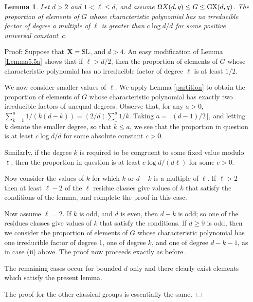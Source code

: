 \documentclass[12pt]{article}
\newtheorem{lemma}[definition]{Lemma}
\newenvironment{proof}{\normalsize {\sc Proof}:}{{\hfill $\Box$ \\}}
\def\SL{{\rm SL}}
\def\GX{{\rm GX}}
\begin{document}
\begin{lemma} 
\label{nofactor}
Let $d > 2$ and $1<\ell\le d$, and 
assume $\Omega X(d,q)\le G\le\GX(d,q)$.  
The proportion of elements of $G$ whose
characteristic polynomial has no irreducible factor of degree a multiple
of $\ell$ is greater than $c\log d/d$ for some positive universal 
constant~$c$.
\end{lemma}
\begin{proof}  
Suppose that $\mathbf{X} = \SL$, and $d>4$.  
An easy modification of Lemma \ref{Lemma5.5a}  shows that 
if $\ell>d/2$, then the proportion of elements of $G$ whose 
characteristic polynomial has no irreducible factor of 
degree $\ell$ is at least $1/2$.  

We now consider smaller values of $\ell$.
We apply Lemma \ref{partition} to obtain 
the proportion of elements of $G$
whose characteristic polynomial has exactly two irreducible factors
of unequal degrees.
Observe that, for any $a>0$,
$\sum_{k=1}^a1/(k(d-k))= (2/d)\sum_1^a1/k$. 
Taking $a=\lfloor(d-1)/2\rfloor$, and letting $k$ denote the smaller degree,
so that $k\le a$,  we see that the proportion in question is
at least $c\log d/d$ for some absolute constant $c>0$.


Similarly, if the degree $k$ is required to be congruent to some
fixed value modulo $\ell$, then the proportion in question is at least
$c\log d/(d\ell)$ for some $c>0$.

Now consider the values of $k$ for which $k$ or $d-k$  
is a multiple of $\ell$.  If $\ell>2$ then at least $\ell-2$ of the
$\ell$  residue classes give values 
of $k$ that satisfy the conditions
of the lemma, and complete the proof in this case.

Now assume $\ell = 2$.
If $k$ is odd, and $d$ is even, then $d-k$ is odd; 
so one of the residues classes give values
of $k$ that satisfy the conditions.
If $d\ge9$ is odd, then we consider the proportion of elements 
of $G$ whose
characteristic polynomial has one irreducible factor of degree 1, 
one of degree $k$, and one of degree $d-k-1$, as in case (ii) above. 
The proof now proceeds exactly as before.

The remaining cases occur for bounded $d$ only and there 
clearly exist elements which satisfy the present lemma.

The proof for the other classical groups is essentially the same.
\end{proof}
\end{document}
